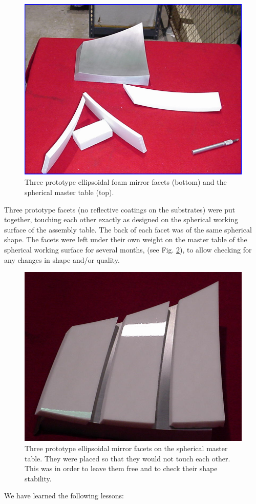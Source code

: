 \begin{figure}[ht]
    \centering
    \includegraphics[width=1.0\linewidth]{images/Proto_4parts.png}
    \caption{Three prototype ellipsoidal foam mirror facets (bottom) and the spherical master table (top).}
    \label{fig:Proto_4parts}
\end{figure}

Three prototype facets (no reflective coatings on the substrates) were put together, touching each other exactly as designed on the spherical working surface of the assembly table. The back of each facet was of the same spherical shape. The facets were left under their own weight on the master table of the spherical working surface for several months, (see Fig. \ref{fig:Prototype}), to allow checking for any changes in shape and/or quality.

\begin{figure}[ht]
    \centering
    \includegraphics[width=1.0\linewidth]{images/Prototype.png}
    \caption{Three prototype ellipsoidal mirror facets on the spherical master table. They were placed so that they would not touch each other. This was in order to leave them free and to check their shape stability.}
    \label{fig:Prototype}
\end{figure}
We have learned the following lessons:

